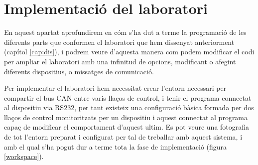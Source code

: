 
\chapter{Implementació del laboratori}\label{cap:imp}


\ifpdf
    \graphicspath{{4_laboratory_implement/figures/PNG/}{4_laboratory_implement/figures/PDF/}{4_laboratory_implement/figures/}}
\else
    \graphicspath{{4_laboratory_implement/figures/EPS/}{4_laboratory_implement/figures/}}
\fi



En aquest apartat aprofundirem en cóm s'ha dut a terme la programació de les diferents parts que conformen el laboratori que hem dissenyat anteriorment (capítol \ref{cap:dis}), i podrem veure d'aquesta manera com podem modificar el codi per ampliar el laboratori amb una infinitud de opcions, modificant o afegint diferents dispositius, o missatges de comunicació.

Per implementar el laboratori hem necessitat crear l'entorn necessari per compartir el bus CAN entre varis llaços de control, i tenir el programa \DCSMonitor connectat al dispositiu \Monitor via RS232, per tant existeix una configuració bàsica formada per dos llaços de control monitoritzats per un dispositiu \Monitor i aquest connectat al programa \DCSMonitor capaç de modificar el comportament d'aquest ultim. Es pot veure una fotografia de tot l'entorn preparat i configurat per tal de treballar amb aquest sistema, i amb el qual s'ha pogut dur a terme tota la fase de implementació (figura \ref{workspace}).


